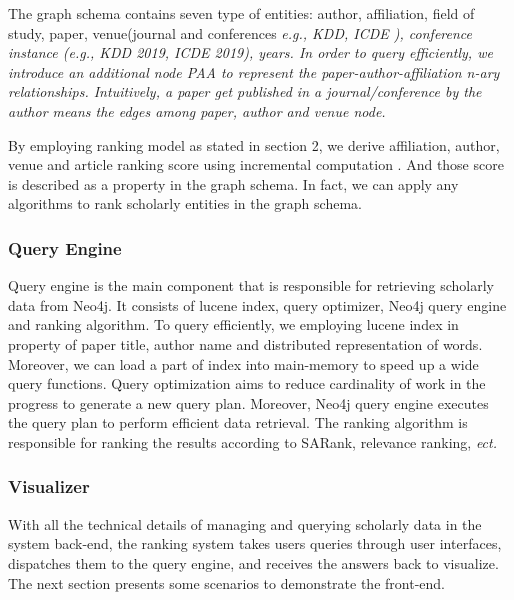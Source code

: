 \par
The graph schema contains seven type of entities: author, affiliation, field of study, paper, venue(journal and conferences \itshape e.g., \upshape KDD, ICDE ), conference instance (\itshape e.g., \upshape KDD 2019, ICDE 2019), years. In order to query efficiently, we introduce an additional node PAA to represent the paper-author-affiliation n-ary relationships. Intuitively, a paper get published in a journal/conference by the author means the edges among paper, author and venue node.

\par
By employing ranking model as stated in section 2, we derive affiliation, author, venue and article ranking score using incremental computation \cite{ma2018query}. And those score is described as a property in the graph schema. In fact, we can apply any algorithms to rank scholarly entities in the graph schema.


\subsubsection{Query Engine}
Query engine is the main component that is responsible for retrieving scholarly data from Neo4j. It consists of lucene index, query optimizer, Neo4j query engine and ranking algorithm. To query efficiently, we employing lucene index in property of paper title, author name and distributed representation of words. Moreover, we can load a part of index into main-memory to speed up a wide query functions.
Query optimization aims to reduce cardinality of work in the progress to generate a new query plan. Moreover, Neo4j query engine executes the query plan to perform efficient data retrieval. The ranking algorithm is responsible for ranking the results according to SARank, relevance ranking,  \itshape ect. \upshape


\subsubsection{Visualizer}
With all the technical details of managing and querying scholarly data in the system back-end, the ranking system takes users queries through user interfaces, dispatches them to the query engine, and receives the answers back to visualize. The next section presents some scenarios to demonstrate the front-end.


